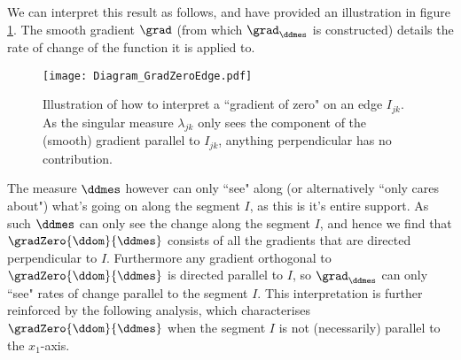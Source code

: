 We can interpret this result as follows, and have provided an illustration in figure \ref{fig:GradZeroEdge}.
The smooth gradient $\grad$ (from which $\grad_\ddmes$ is constructed) details the rate of change of the function it is applied to.
\begin{figure}[b]
	\centering
	\texttt{[image: Diagram\_GradZeroEdge.pdf]}
	\caption{\label{fig:GradZeroEdge} Illustration of how to interpret a ``gradient of zero" on an edge $I_{jk}$. As the singular measure $\lambda_{jk}$ only sees the component of the (smooth) gradient parallel to $I_{jk}$, anything perpendicular has no contribution.}
\end{figure}
The measure $\ddmes$ however can only ``see" along (or alternatively ``only cares about") what's going on along the segment $I$, as this is it's entire support.
As such $\ddmes$ can only see the change along the segment $I$, and hence we find that $\gradZero{\ddom}{\ddmes}$ consists of all the gradients that are directed perpendicular to $I$.
Furthermore any gradient orthogonal to $\gradZero{\ddom}{\ddmes}$ is directed parallel to $I$, so $\grad_\ddmes$ can only ``see" rates of change parallel to the segment $I$.
This interpretation is further reinforced by the following analysis, which characterises $\gradZero{\ddom}{\ddmes}$ when the segment $I$ is not (necessarily) parallel to the $x_1$-axis. \newline

